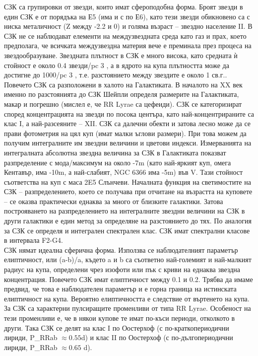 \documentclass[a4paper,12pt]{article}
\begin{document}
СЗК са групировки от звезди, които имат сфероподобна форма. Броят звезди в един СЗК е от порядъка на Е5 (има и с по Е6), като тези звезди обикновено са с ниска металичност (Z между -2.2 и 0) и голяма възраст – звездно население II. В СЗК не се наблюдават елементи на междузвездната среда като газ и прах, което предполага, че всичката междузвездна материя
вече е преминала през процеса на звездообразуване. Звездната плътност в СЗК е много висока, като средната ѝ стойност е около 0.4 звезди/pc 3 , а в ядрото на купа плътността може да достигне до 1000/pc 3 , т.е. разстоянието между звездите е около 1 св.г.. Повечето СЗК са разположени в халото на Галактиката. В началото на XX век именно по разстоянията до СЗК Шейпли определя размерите на Галактиката, макар и погрешно (мислел е, че RR Lyrae са цефеиди). СЗК се категоризират според концентрацията на звезди по посока центъра, като най-концентрираните са клас I, а най-разсеяните – XII. СЗК са далечни обекти и затова лесно може да се прави фотометрия на цял куп (имат малки ъглови размери). При това можем да получим интегралните им звездни величини и цветови индекси. Измерванията на интегралната абсолютна звездна величина за СЗК в Галактиката показват разпределение с мода/максимум на около -7m (като най-яркият куп, омега Кентавър, има -10m, а най-слабият, NGC 6366 има -5m) във V. Тази стойност съответства на куп с маса 2E5 Слънчеви. Началната функция на светимостите на СЗК – разпределението, което се получава при отчитане на възрастта на куповете – се оказва практически еднаква за много от близките галактики. Затова построяването на разпределението на интегралните звездни величини на СЗК в други галактики е един метод за определяне на разстоянието до тях. По аналогия за СЗК се определя и интегрален спектрален клас. СЗК имат спектрални класове в интервала F2-G4.\\

СЗК нямат идеална сферична форма. Използва се наблюдателният параметър елиптичност, или (a-b)/a, където a и b са съответно най-големият и най-малкият радиус на купа, определени чрез изофоти или пък с криви на еднаква звездна концентрация. Повечето СЗК имат елиптичност между 0.1 и 0.2. Трябва да имаме предвид, че това е наблюдателен параметър и е горна граница на истинската елиптичност на купа. Вероятно елиптичността е следствие от въртенето на купа. За СЗК са характерни пулсиращите променливи от типа RR Lyrae. Особеност на тези променливи е, че в някои купове те имат по-къси периоди, отколкото в други. Така СЗК се делят на клас I по Оостерхоф (с по-краткопериодични лириди, P\_RRab $\approx 0.55$d) и клас II по Оостерхоф (с по-дългопериодични лириди, P\_RRab $\approx 0.65$ d).\\
\end{document}
